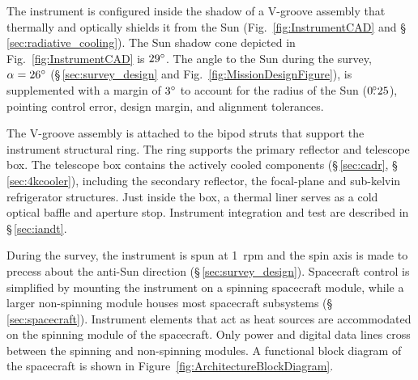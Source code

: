The instrument is configured inside the shadow of a V-groove assembly that thermally and optically shields it from the Sun (Fig.~\ref{fig:InstrumentCAD} and \S\,\ref{sec:radiative_cooling}). 
The Sun shadow cone depicted in Fig.~\ref{fig:InstrumentCAD} is $29^\circ$. The angle to the Sun during the survey, $\alpha = 26^\circ$ (\S\,\ref{sec:survey_design} and Fig.~\ref{fig:MissionDesignFigure}), is supplemented with a margin of $3^\circ$ to account for the radius of the Sun ($0.\!\!^\circ25$), pointing control error, design margin, and alignment tolerances.

The V-groove assembly is attached to the bipod struts that support the instrument structural ring. The ring supports the primary reflector and telescope box. The telescope box contains the actively cooled components (\S\,\ref{sec:cadr}, \S\,\ref{sec:4kcooler}), including the secondary reflector, the focal-plane and sub-kelvin refrigerator structures. Just inside the box, a thermal liner serves as a cold optical baffle and aperture stop. Instrument integration and test are described in \S\,\ref{sec:iandt}.

During the survey, the instrument is spun at 1~rpm and the spin axis is made to precess about the anti-Sun direction (\S\,\ref{sec:survey_design}). Spacecraft control is simplified by mounting the instrument on a spinning spacecraft module, while a larger non-spinning module houses most spacecraft subsystems (\S\,\ref{sec:spacecraft}). Instrument elements that act as heat sources are accommodated on the spinning module of the spacecraft. Only power and digital data lines cross between the spinning and non-spinning modules.  A functional block diagram of the spacecraft is shown in Figure~\ref{fig:ArchitectureBlockDiagram}. 

